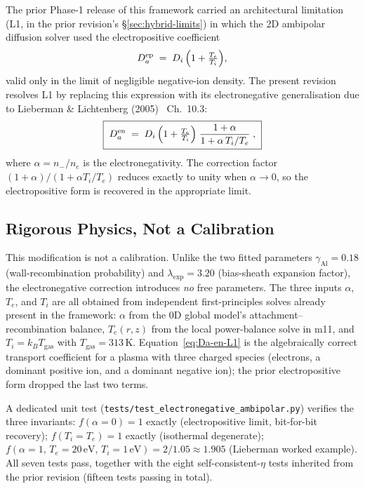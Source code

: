 \documentclass[11pt,a4paper]{report}
\begin{document}
The prior Phase-1 release of this framework carried an architectural limitation (L1, in the prior revision's \S\ref{sec:hybrid-limits}) in which the 2D ambipolar diffusion solver used the electropositive coefficient
\[
  D_a^\mathrm{ep} \;=\; D_i\,\Bigl(1 + \tfrac{T_e}{T_i}\Bigr),
\]
valid only in the limit of negligible negative-ion density.  The present revision resolves L1 by replacing this expression with its electronegative generalisation due to Lieberman \& Lichtenberg (2005)~\cite{Lieberman2005} Ch.~10.3:
\begin{equation}
  \boxed{\;D_a^\mathrm{en} \;=\; D_i\,\Bigl(1 + \tfrac{T_e}{T_i}\Bigr)
  \;\frac{1 + \alpha}{1 + \alpha\,T_i/T_e}\;,\;}
  \label{eq:Da-en-L1}
\end{equation}
where $\alpha = n_{-}/n_e$ is the electronegativity.  The correction factor $(1+\alpha)/(1+\alpha T_i/T_e)$ reduces exactly to unity when $\alpha \to 0$, so the electropositive form is recovered in the appropriate limit.

\subsection{Rigorous Physics, Not a Calibration}

This modification is not a calibration.  Unlike the two fitted parameters $\gamma_\mathrm{Al} = 0.18$ (wall-recombination probability) and $\lambda_\mathrm{exp} = 3.20$ (bias-sheath expansion factor), the electronegative correction introduces \emph{no} free parameters.  The three inputs $\alpha$, $T_e$, and $T_i$ are all obtained from independent first-principles solves already present in the framework: $\alpha$ from the 0D global model's attachment--recombination balance, $T_e(r,z)$ from the local power-balance solve in m11, and $T_i = k_B T_\mathrm{gas}$ with $T_\mathrm{gas} = 313$\,K.  Equation~\ref{eq:Da-en-L1} is the algebraically correct transport coefficient for a plasma with three charged species (electrons, a dominant positive ion, and a dominant negative ion); the prior electropositive form dropped the last two terms.

A dedicated unit test (\texttt{tests/test\_electronegative\_ambipolar.py}) verifies the three invariants: $f(\alpha{=}0) = 1$ exactly (electropositive limit, bit-for-bit recovery); $f(T_i{=}T_e) = 1$ exactly (isothermal degenerate); $f(\alpha{=}1,\,T_e{=}20\,\text{eV},\,T_i{=}1\,\text{eV}) = 2/1.05 \approx 1.905$ (Lieberman worked example).  All seven tests pass, together with the eight self-consistent-$\eta$ tests inherited from the prior revision (fifteen tests passing in total).
\end{document}
